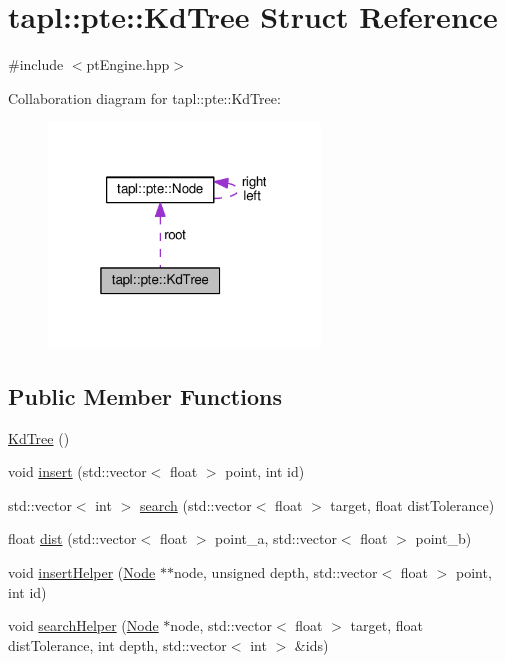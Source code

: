 \hypertarget{structtapl_1_1pte_1_1KdTree}{}\section{tapl\+:\+:pte\+:\+:Kd\+Tree Struct Reference}
\label{structtapl_1_1pte_1_1KdTree}


{\ttfamily \#include $<$pt\+Engine.\+hpp$>$}



Collaboration diagram for tapl\+:\+:pte\+:\+:Kd\+Tree\+:\nopagebreak
\begin{figure}[H]
\begin{center}
\leavevmode
\includegraphics[width=205pt]{structtapl_1_1pte_1_1KdTree__coll__graph}
\end{center}
\end{figure}
\subsection*{Public Member Functions}
\begin{DoxyCompactItemize}
\item 
\hyperlink{structtapl_1_1pte_1_1KdTree_a2b25b4997076cce12e0c3b38ed8217fe}{Kd\+Tree} ()
\item 
void \hyperlink{structtapl_1_1pte_1_1KdTree_acaf4969659031fa301d1b7e46d6b3b77}{insert} (std\+::vector$<$ float $>$ point, int id)
\item 
std\+::vector$<$ int $>$ \hyperlink{structtapl_1_1pte_1_1KdTree_a99b69a039013a6bbc2be7041190168b1}{search} (std\+::vector$<$ float $>$ target, float dist\+Tolerance)
\item 
float \hyperlink{structtapl_1_1pte_1_1KdTree_a58fd56f5fcbc48ec95e975cc02471d1b}{dist} (std\+::vector$<$ float $>$ point\+\_\+a, std\+::vector$<$ float $>$ point\+\_\+b)
\item 
void \hyperlink{structtapl_1_1pte_1_1KdTree_a388598d62bc5f21a5f5b802a8feecc74}{insert\+Helper} (\hyperlink{structtapl_1_1pte_1_1Node}{Node} $\ast$$\ast$node, unsigned depth, std\+::vector$<$ float $>$ point, int id)
\item 
void \hyperlink{structtapl_1_1pte_1_1KdTree_a8add21f54b1f0ee01746582073e9fac5}{search\+Helper} (\hyperlink{structtapl_1_1pte_1_1Node}{Node} $\ast$node, std\+::vector$<$ float $>$ target, float dist\+Tolerance, int depth, std\+::vector$<$ int $>$ \&ids)
\end{DoxyCompactItemize}
